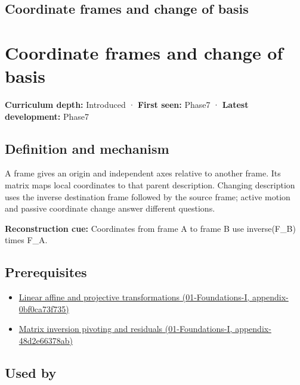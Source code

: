 \hypertarget{appendix-1bae9457dbc3}{}
\section*{Coordinate frames and change of basis}
\chapter{Coordinate frames and change of basis}\label{appendix-1bae9457dbc3-coordinate-frames-and-change-of-basis}

\textbf{Curriculum depth:} Introduced · \textbf{First seen:} Phase7 · \textbf{Latest development:} Phase7

\section{Definition and mechanism}\label{appendix-1bae9457dbc3-definition-and-mechanism}

A frame gives an origin and independent axes relative to another frame. Its matrix maps local coordinates to that parent description. Changing description uses the inverse destination frame followed by the source frame; active motion and passive coordinate change answer different questions.

\textbf{Reconstruction cue:} Coordinates from frame A to frame B use inverse(F\_B) times F\_A.

\section{Prerequisites}\label{appendix-1bae9457dbc3-prerequisites}

\begin{itemize}
\tightlist
\item
  \href{../01-Foundations-I/main.pdf\#nameddest=appendix-0bf0ca73f735}{Linear affine and projective transformations (01-Foundations-I, appendix-0bf0ca73f735)}
\item
  \href{../01-Foundations-I/main.pdf\#nameddest=appendix-48d2e66378ab}{Matrix inversion pivoting and residuals (01-Foundations-I, appendix-48d2e66378ab)}
\end{itemize}

\section{Used by}\label{appendix-1bae9457dbc3-used-by}


